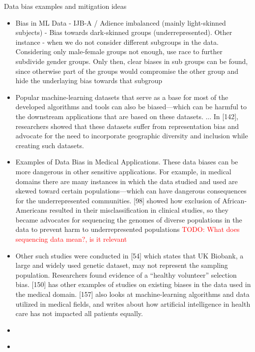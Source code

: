 \documentclass[12pt, a4paper, oneside]{book}   	%
\renewcommand{\todo}[1]{\textcolor{red}{TODO: #1}}
\begin{document}
			
			Data bias examples and mitigation ideas
			\begin{itemize}
				\item Bias in ML Data - IJB-A / Adience imbalanced (mainly light-skinned subjects) - Bias towards dark-skinned groups (underrepresented). Other instance - when we do not consider different subgroups in the data. Considering only male-female groups not enough, use race to further subdivide gender groups. Only then, clear biases in sub groups can be found, since otherwise part of the groups would  compromise the other group and hide the underlaying bias towards that subgroup \autocite{Mehrabi_2021}
				\item Popular machine-learning datasets that serve as a base for most of the developed algorithms and tools can also be biased—which can be harmful to the downstream applications that are based on these datasets. ... In [142], researchers showed that these datasets suffer from representation bias and advocate for the need to incorporate geographic diversity and inclusion while creating such datasets. \autocite{Mehrabi_2021}
				\item Examples of Data Bias in Medical Applications. These data biases can be more dangerous in other sensitive applications. For example, in medical domains there are many instances in which the data studied and used are skewed toward certain populations—which can have dangerous consequences for the underrepresented communities. [98] showed how exclusion of African-Americans resulted in their misclassification in clinical studies, so they became advocates for sequencing the genomes of diverse populations in the data to prevent harm to underrepresented populations \autocite{Mehrabi_2021} \todo{What does sequencing data mean?, is it relevant}
				\item Other such studies were conducted in [54] which states that UK Biobank, a large and widely used genetic dataset, may not represent the sampling population. Researchers found evidence of a “healthy volunteer” selection bias. [150] has other examples of studies on existing biases in the data used in the medical domain. [157] also looks at machine-learning algorithms and data utilized in medical fields, and writes about how artificial intelligence in health care has not impacted all patients equally.\autocite{Mehrabi_2021}
				\item \autocite{Mehrabi_2021}
				\item \autocite{Mehrabi_2021}
			\end{itemize}
			
\end{document}
